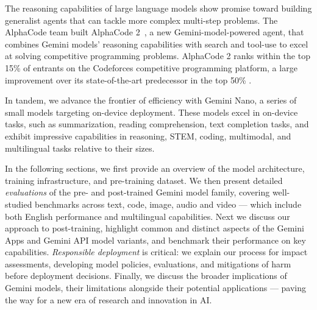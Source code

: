 The reasoning capabilities of large language models show promise toward building generalist agents that can tackle more complex multi-step problems. The AlphaCode team built AlphaCode 2~\citep{gdm2023alphacode2}, a new Gemini-model-powered agent, that combines Gemini models' reasoning capabilities with search and tool-use to excel at solving competitive programming problems. 
AlphaCode 2 ranks within the top 15\% of entrants on the Codeforces competitive programming platform, a large improvement over its state-of-the-art predecessor in the top 50\% \citep{alphacode}. 

In tandem, we advance the frontier of efficiency with Gemini Nano, a series of small models targeting on-device deployment. These models excel in on-device tasks, such as summarization, reading comprehension, text completion tasks, and exhibit impressive capabilities in reasoning, STEM, coding, multimodal, and multilingual tasks relative to their sizes. 

In the following sections, we first provide an overview of the model architecture, training infrastructure, and pre-training dataset. We then present detailed \textit{evaluations} of the pre- and post-trained Gemini model family, covering well-studied benchmarks across text, code, image, audio and video --- which include both English performance and multilingual capabilities.  Next we discuss our approach to post-training, highlight common and distinct aspects of the Gemini Apps and Gemini API model variants, and benchmark their performance on key capabilities. \textit{Responsible deployment} is critical: we explain our process for impact assessments, developing model policies, evaluations, and mitigations of harm before deployment decisions. Finally, we discuss the broader implications of Gemini models, their limitations alongside their potential applications --- paving the way for a new era of research and innovation in AI. 
